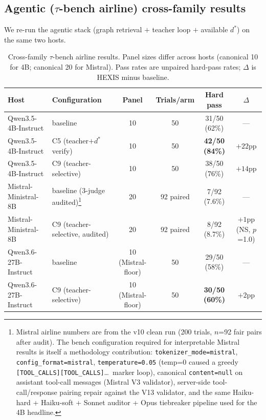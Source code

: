 \subsection{Agentic ($\tau$-bench airline) cross-family results}

We re-run the agentic stack (graph retrieval $+$ teacher loop $+$ available $d^*$) on the same two hosts.

\begin{table}[!ht]
\centering
\small
\caption{Cross-family $\tau$-bench airline results. Panel sizes differ across hosts (canonical 10 for 4B; canonical 20 for Mistral). Pass rates are unpaired hard-pass rates; $\Delta$ is HEXIS minus baseline.}
\label{tab:cross_family_agentic}
\begin{tabular}{llcccc}
\toprule
\textbf{Host} & \textbf{Configuration} & \textbf{Panel} & \textbf{Trials/arm} & \textbf{Hard pass} & \textbf{$\Delta$} \\
\midrule
Qwen3.5-4B-Instruct  & baseline & 10 & 50 & 31/50 (62\%) & ---             \\
Qwen3.5-4B-Instruct  & C5 (teacher$+d^*$ verify) & 10 & 50 & \textbf{42/50 (84\%)} & $+22$pp \\
Qwen3.5-4B-Instruct  & C9 (teacher-selective)    & 10 & 50 & 38/50 (76\%) & $+14$pp \\
\midrule
Mistral-Ministral-8B & baseline (3-judge audited)\footnote{Mistral airline numbers are from the v10 clean run (200 trials, $n$=92 fair pairs after audit). The bench configuration required for interpretable Mistral results is itself a methodology contribution: \texttt{tokenizer\_mode=mistral}, \texttt{config\_format=mistral}, \texttt{temperature=0.05} (temp=0 caused a greedy \texttt{[TOOL\_CALLS][TOOL\_CALLS]}\ldots\ marker loop), canonical \texttt{content=null} on assistant tool-call messages (Mistral V3 validator), server-side tool-call/response pairing repair against the V13 validator, and the same Haiku-hard + Haiku-soft + Sonnet auditor + Opus tiebreaker pipeline used for the 4B headline.} & 20 & 92 paired & 7/92 (7.6\%) & ---     \\
Mistral-Ministral-8B & C9 (teacher-selective, audited) & 20 & 92 paired & 8/92 (8.7\%) & $+1$pp (NS, $p$=1.0) \\
\midrule
Qwen3.6-27B-Instruct & baseline                  & 10 (Mistral-floor) & 50 & 29/50 (58\%) & ---     \\
Qwen3.6-27B-Instruct & C9 (teacher-selective)    & 10 (Mistral-floor) & 50 & \textbf{30/50 (60\%)} & $+2$pp  \\
\bottomrule
\end{tabular}
\end{table}

